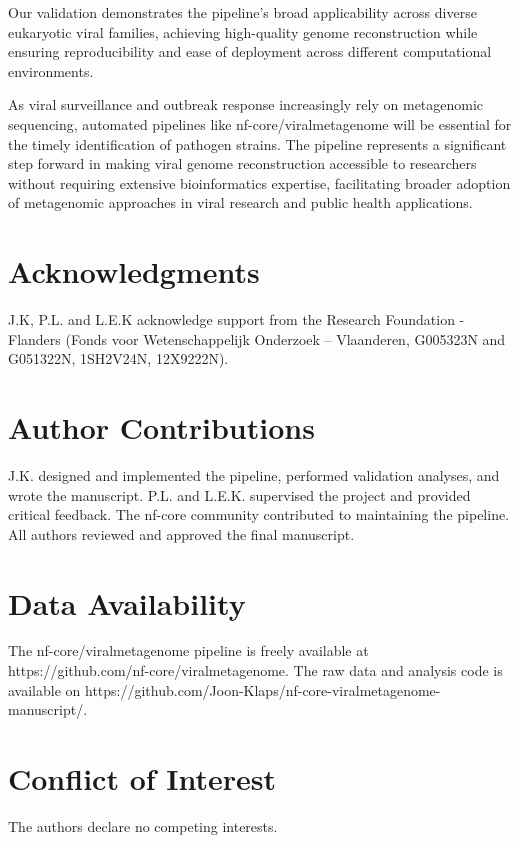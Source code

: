 Our validation demonstrates the pipeline's broad applicability across diverse eukaryotic viral families, achieving high-quality genome reconstruction while ensuring reproducibility and ease of deployment across different computational environments.

As viral surveillance and outbreak response increasingly rely on metagenomic sequencing, automated pipelines like nf-core/viralmetagenome will be essential for the timely identification of pathogen strains. The pipeline represents a significant step forward in making viral genome reconstruction accessible to researchers without requiring extensive bioinformatics expertise, facilitating broader adoption of metagenomic approaches in viral research and public health applications.


\section*{Acknowledgments}
 J.K, P.L. and L.E.K  acknowledge support from the Research Foundation - Flanders (Fonds voor Wetenschappelijk Onderzoek – Vlaanderen, G005323N and G051322N, 1SH2V24N, 12X9222N).

\section*{Author Contributions}
J.K. designed and implemented the pipeline, performed validation analyses, and wrote the manuscript. P.L. and L.E.K. supervised the project and provided critical feedback. The nf-core community contributed to maintaining the pipeline. All authors reviewed and approved the final manuscript.

\section*{Data Availability}
The nf-core/viralmetagenome pipeline is freely available at https://github.com/nf-core/viralmetagenome.
The raw data and analysis code is available on https://github.com/Joon-Klaps/nf-core-viralmetagenome-manuscript/.

\section*{Conflict of Interest}
The authors declare no competing interests.

